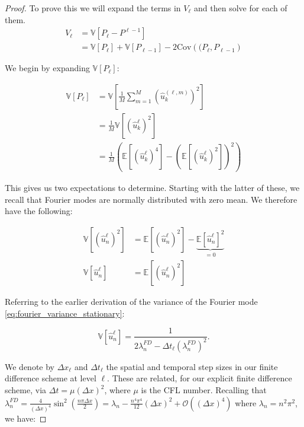 \begin{proof}
    To prove this we will expand the terms in $V_\ell$ and then 
    solve for each of them.
    \begin{align*}
    V_\ell &= \mathbb{V}[P_\ell - P^{\ell - 1}]\\
    &= \mathbb{V}[P_\ell] + 
        \mathbb{V}[P_{\ell-1}] - 
        2 \mathrm{Cov}\left((P_\ell, P_{\ell - 1}\right)
    \end{align*}

    We begin by expanding $\mathbb{V}[P_\ell]$:

    \begin{align*}
        \mathbb{V}[P_\ell] &= 
        \mathbb{V}\left[\frac{1}{M}\sum_{m=1}^M
        \left(\hat{u}_k^{(\ell, m)}\right)^2\right] \\
        &= \frac{1}{M}\mathbb{V}\left[ (\hat{u}_k^\ell)^2 \right]\\
        &= \frac{1}{M}\left(\mathbb{E}[(\hat{u}_k^\ell)^4] 
        - \left(\mathbb{E}[(\hat{u}_k^\ell)^2]\right)^2\right)
    \end{align*}

    This gives us two expectations to determine. 
    Starting with the latter of these, we recall that 
    Fourier modes are normally distributed with 
    zero mean.
    We therefore have the following:

    \begin{align*}
        \mathbb{V}[(\hat{u}_n^\ell)^2] &= 
        \mathbb{E}[(\hat{u}_n^\ell)^2] - 
        \underbrace{\mathbb{E}[\hat{u}_n^\ell]^2}_{=0}\\
        \mathbb{V}[\hat{u}_n^\ell] &= \mathbb{E}[(\hat{u}_n^\ell)^2]
    \end{align*}

    Referring to the earlier derivation of the variance 
    of the Fourier mode \eqref{eq:fourier_variance_stationary}:
    
    \begin{equation}\label{eq:fourier_mode_var}
        \mathbb{V}[\hat{u}_n^\ell] = \frac{1}{2 \lambda_n^{FD} - 
        \Delta t_\ell (\lambda_n^{FD})^2}.
    \end{equation}

    We denote by $\Delta x_\ell$ and $\Delta t_\ell$ the spatial
    and temporal step sizes in our finite difference scheme at level 
    $\ell$.
    These are related, for our explicit finite difference scheme,
    via $\Delta t = \mu (\Delta x)^2$, where $\mu$ is the CFL
    number. Recalling that $\lambda_n^{FD} = \frac{4}{(\Delta x)^4} 
    \sin^2\left(\frac{n \pi \Delta x}{2}\right) = \lambda_n - 
    \frac{n^4 \pi^4}{12}(\Delta x)^2 + \mathcal{O}((\Delta x)^4)$
    where $\lambda_n = n^2 \pi^2$, we have:


\end{proof}

